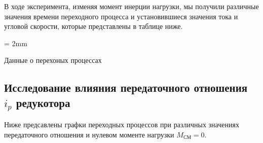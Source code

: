 \documentclass[a4paper, 12pt]{article}
\begin{document}
\newpage
В ходе эксперимента, изменяя момент инерции нагрузки, мы получили различные значения времени переходного процесса и установившиеся значения тока и угловой скорости, которые представлены в таблице ниже.

\begin{table}[h!]
	\tabulinesep = 2mm
	\centering
   \begin{threeparttable}
        \caption{Данные о перехоных процессах }
    \end{threeparttable}
\end{table}

\newpage
\begin{center}
\section{Исследование влияния передаточного отношения $i_p$ редукотора}
\end{center}
\par Ниже предсавлены графки переходных процессов при различных значениях передаточного отношения и нулевом моменте нагрузки $M_\text{СМ} = 0$.
\end{document}
